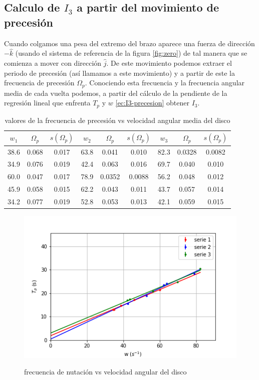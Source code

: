 \documentclass[12pt,a4paper]{article}
\begin{document}
\subsection{Calculo de $I_3$ a partir del movimiento de precesión}
Cuando colgamos una pesa del extremo del brazo aparece una fuerza de dirección $-\hat{k}$ (usando el sistema de referencia de la figura \ref{fig:zero}) de tal manera que se comienza a mover con dirección $\hat{j}$. De este movimiento podemos extraer el periodo de precesión (así llamamos a este movimiento) y a partir de este la frecuencia de precesión $\Omega_p$. Conociendo esta frecuencia y la frecuencia angular media de cada vuelta podemos, a partir del cálculo de la pendiente de la regresión lineal que enfrenta $T_p$ y $w$ \ref{ec:I3-precesion} obtener $I_3$.

\begin{table}[h!] \centering
\begin{tabular}{|c|c|c||c|c|c||c|c|c|}
\hline $ w_1 $ 	 & $ \Omega_p $ 	 & $s(\Omega_p)$ 	 & $w_2$ 	 & $\Omega_p$ 	 & $s(\Omega_p)$ 	 & $w_3$ 	 & $\Omega_p$ 	 &  $s(\Omega_p)$ \\ \hline 
38.6 	 & 0.068 	 & 0.017 	 & 63.8 	 & 0.041 	 & 0.010 	 & 82.3 	 & 0.0328	 & 0.0082  \\ 
34.9 	 & 0.076 	 & 0.019 	 & 42.4 	 & 0.063 	 & 0.016 	 & 69.7 	 & 0.040 	 & 0.010  \\ 
60.0 	 & 0.047 	 & 0.017 	 & 78.9 	 & 0.0352 	 & 0.0088 	 & 56.2 	 & 0.048 	 & 0.012  \\ 
45.9 	 & 0.058 	 & 0.015 	 & 62.2 	 & 0.043 	 & 0.011 	 & 43.7 	 & 0.057 	 & 0.014  \\ 
34.2 	 & 0.077 	 & 0.019 	 & 52.8 	 & 0.053 	 & 0.013 	 & 42.1 	 & 0.059 	 & 0.015  \\ \hline
\end{tabular}
\caption{valores de la frecuencia de precesión vs velocidad angular media del disco}
\label{caca}
\end{table}

\begin{figure}[h!] \centering
\includegraphics[scale=1]{regresionlineal-precesion.png}
\label{fig:second}
\caption{frecuencia de nutación vs velocidad angular del disco}
\end{figure}
\end{document}
